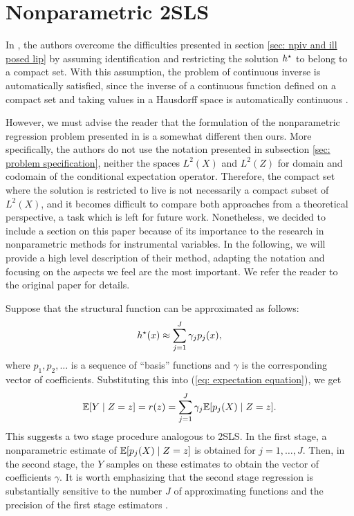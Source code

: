\section{Nonparametric 2SLS}

In \cite{newey2003}, the authors overcome the difficulties presented in section \ref{sec: npiv and ill posed lip} by assuming identification and restricting the solution $ h^{ \star } $ to belong to a compact set.
With this assumption, the problem of continuous inverse is automatically satisfied, since the inverse of a continuous function defined on a compact set and taking values in a Hausdorff space is automatically continuous \cite{munkres2000}.

However, we must advise the reader that the formulation of the nonparametric regression problem presented in \cite{newey2003} is a somewhat different then ours.
More specifically, the authors do not use the notation presented in subsection \ref{sec: problem specification}, neither the spaces $ L^2 ( X ) $ and $ L^2 ( Z ) $ for domain and codomain of the conditional expectation operator.
Therefore, the compact set where the solution is restricted to live is not necessarily a compact subset of $ L^{ 2 } ( X ) $, and it becomes difficult to compare both approaches from a theoretical perspective, a task which is left for future work.
Nonetheless, we decided to include a section on this paper because of its importance to the research in nonparametric methods for instrumental variables.
In the following, we will provide a high level description of their method, adapting the notation and focusing on the aspects we feel are the most important.
We refer the reader to the original paper for details.

Suppose that the structural function can be approximated as follows:
\begin{equation}
    \label{eq: expansion on basis functions}
    h^{ \star } ( x ) \approx \sum_{ j=1 }^{ J } \gamma_{ j } p_{ j } ( x )
,\end{equation}
where $ p_{ 1 }, p_{ 2 }, \dots $ is a sequence of ``basis'' functions and $ \gamma $ is the corresponding vector of coefficients.
Substituting this into (\ref{eq: expectation equation}), we get
\begin{equation}
    \label{eq: projected expansion}
    \mathbb{E} [ Y \mid Z = z ] = r ( z ) = \sum_{ j=1 }^{ J } \gamma_{ j } \mathbb{E} [ p_{ j } ( X ) \mid Z = z ]
.\end{equation}
This suggests a two stage procedure analogous to 2SLS.
In the first stage, a nonparametric estimate of $ \mathbb{E} [ p_{ j } ( X ) \mid Z = z ] $ is obtained for $ j = 1, \dots, J $.
Then, in the second stage, the $ Y $ samples on these estimates to obtain the vector of coefficients $ \gamma $.
It is worth emphasizing that the second stage regression is substantially sensitive to the number $ J $ of approximating functions and the precision of the first stage estimators \cite{newey2003}.

